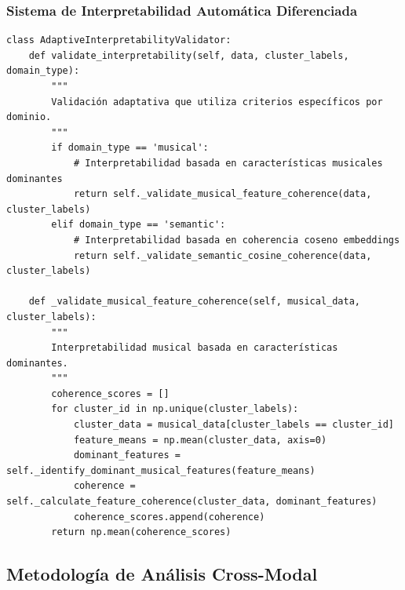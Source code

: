 \documentclass[12pt,a4paper]{report}
\begin{document}
\subsubsection{Sistema de Interpretabilidad Automática Diferenciada}

\begin{lstlisting}[caption={Validación Automática de Interpretabilidad Adaptativa}]
class AdaptiveInterpretabilityValidator:
    def validate_interpretability(self, data, cluster_labels, domain_type):
        """
        Validación adaptativa que utiliza criterios específicos por dominio.
        """
        if domain_type == 'musical':
            # Interpretabilidad basada en características musicales dominantes
            return self._validate_musical_feature_coherence(data, cluster_labels)
        elif domain_type == 'semantic':
            # Interpretabilidad basada en coherencia coseno embeddings
            return self._validate_semantic_cosine_coherence(data, cluster_labels)

    def _validate_musical_feature_coherence(self, musical_data, cluster_labels):
        """
        Interpretabilidad musical basada en características dominantes.
        """
        coherence_scores = []
        for cluster_id in np.unique(cluster_labels):
            cluster_data = musical_data[cluster_labels == cluster_id]
            feature_means = np.mean(cluster_data, axis=0)
            dominant_features = self._identify_dominant_musical_features(feature_means)
            coherence = self._calculate_feature_coherence(cluster_data, dominant_features)
            coherence_scores.append(coherence)
        return np.mean(coherence_scores)
\end{lstlisting}

\subsection{Metodología de Análisis Cross-Modal}
\end{document}
